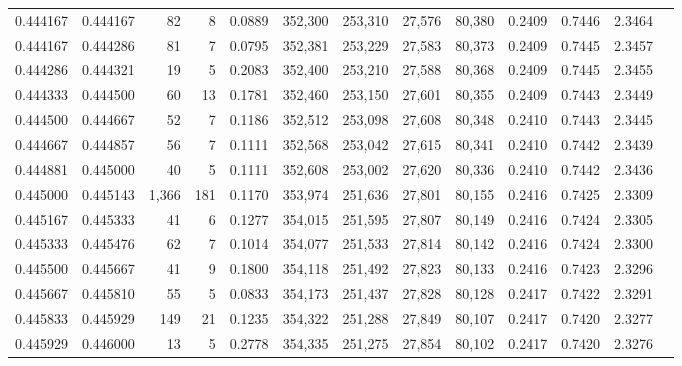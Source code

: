 \begin{tabular}{rrrrrrrrrrrrr}
0.444167 & 0.444167 &    82 &   8 &                                     0.0889 & 352,300 & 253,310 &  27,576 &  80,380 & 0.2409 & 0.7446 & 2.3464 \\
0.444167 & 0.444286 &    81 &   7 &                                     0.0795 & 352,381 & 253,229 &  27,583 &  80,373 & 0.2409 & 0.7445 & 2.3457 \\
0.444286 & 0.444321 &    19 &   5 &                                     0.2083 & 352,400 & 253,210 &  27,588 &  80,368 & 0.2409 & 0.7445 & 2.3455 \\
0.444333 & 0.444500 &    60 &  13 &                                     0.1781 & 352,460 & 253,150 &  27,601 &  80,355 & 0.2409 & 0.7443 & 2.3449 \\
0.444500 & 0.444667 &    52 &   7 &                                     0.1186 & 352,512 & 253,098 &  27,608 &  80,348 & 0.2410 & 0.7443 & 2.3445 \\
0.444667 & 0.444857 &    56 &   7 &                                     0.1111 & 352,568 & 253,042 &  27,615 &  80,341 & 0.2410 & 0.7442 & 2.3439 \\
0.444881 & 0.445000 &    40 &   5 &                                     0.1111 & 352,608 & 253,002 &  27,620 &  80,336 & 0.2410 & 0.7442 & 2.3436 \\
0.445000 & 0.445143 & 1,366 & 181 &                                     0.1170 & 353,974 & 251,636 &  27,801 &  80,155 & 0.2416 & 0.7425 & 2.3309 \\
0.445167 & 0.445333 &    41 &   6 &                                     0.1277 & 354,015 & 251,595 &  27,807 &  80,149 & 0.2416 & 0.7424 & 2.3305 \\
0.445333 & 0.445476 &    62 &   7 &                                     0.1014 & 354,077 & 251,533 &  27,814 &  80,142 & 0.2416 & 0.7424 & 2.3300 \\
0.445500 & 0.445667 &    41 &   9 &                                     0.1800 & 354,118 & 251,492 &  27,823 &  80,133 & 0.2416 & 0.7423 & 2.3296 \\
0.445667 & 0.445810 &    55 &   5 &                                     0.0833 & 354,173 & 251,437 &  27,828 &  80,128 & 0.2417 & 0.7422 & 2.3291 \\
0.445833 & 0.445929 &   149 &  21 &                                     0.1235 & 354,322 & 251,288 &  27,849 &  80,107 & 0.2417 & 0.7420 & 2.3277 \\
0.445929 & 0.446000 &    13 &   5 &                                     0.2778 & 354,335 & 251,275 &  27,854 &  80,102 & 0.2417 & 0.7420 & 2.3276 \\

\end{tabular}
